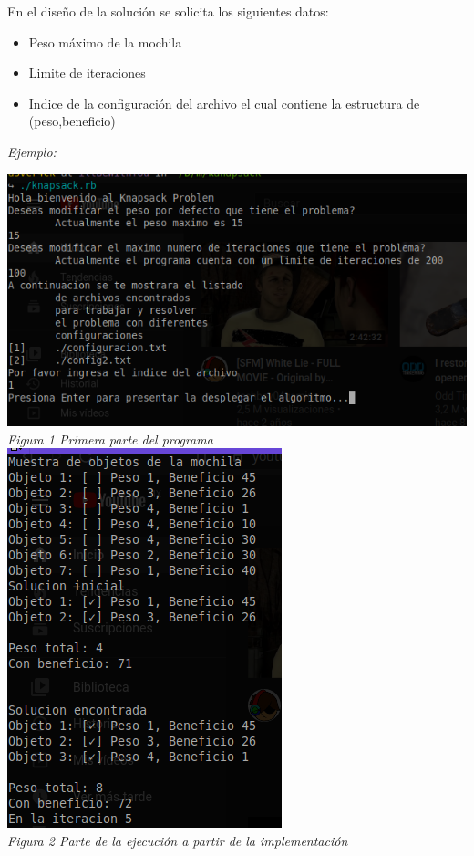 \documentclass[10pt]{article}
\begin{document}
En el diseño de la solución se solicita los siguientes datos:
\begin{itemize}
  \item Peso máximo de la mochila
  \item Limite de iteraciones
  \item Indice de la configuración del archivo el cual contiene la estructura de (peso,beneficio)
\end{itemize}
\textit{Ejemplo:}
\begin{center}
  \includegraphics[scale=0.5]{imgsRMCH/knapsack.png}\\
  \textit{Figura 1 Primera parte del programa}\\
  \includegraphics[scale=0.5]{imgsRMCH/knapsack1.png}\\
  \textit{Figura 2 Parte de la ejecución a partir de la implementación}
\end{center}
\end{document}
